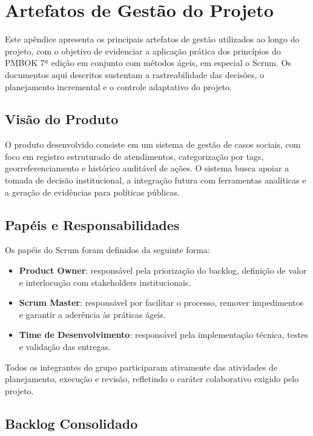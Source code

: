 \chapter{Artefatos de Gestão do Projeto}\label{apx:artefatos}

Este apêndice apresenta os principais artefatos de gestão utilizados ao longo do projeto, com o objetivo de evidenciar a aplicação prática dos princípios do PMBOK 7ª edição em conjunto com métodos ágeis, em especial o Scrum. Os documentos aqui descritos sustentam a rastreabilidade das decisões, o planejamento incremental e o controle adaptativo do projeto.

\section{Visão do Produto}

O produto desenvolvido consiste em um sistema de gestão de casos sociais, com foco em registro estruturado de atendimentos, categorização por tags, georreferenciamento e histórico auditável de ações. O sistema busca apoiar a tomada de decisão institucional, a integração futura com ferramentas analíticas e a geração de evidências para políticas públicas.

\section{Papéis e Responsabilidades}

Os papéis do Scrum foram definidos da seguinte forma:
\begin{itemize}
    \item \textbf{Product Owner}: responsável pela priorização do backlog, definição de valor e interlocução com stakeholders institucionais.
    \item \textbf{Scrum Master}: responsável por facilitar o processo, remover impedimentos e garantir a aderência às práticas ágeis.
    \item \textbf{Time de Desenvolvimento}: responsável pela implementação técnica, testes e validação das entregas.
\end{itemize}

Todos os integrantes do grupo participaram ativamente das atividades de planejamento, execução e revisão, refletindo o caráter colaborativo exigido pelo projeto.

\section{Backlog Consolidado}

